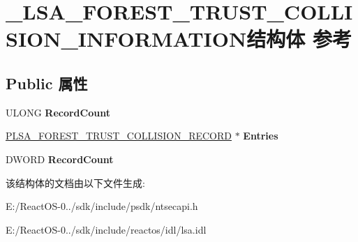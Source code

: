 \hypertarget{struct___l_s_a___f_o_r_e_s_t___t_r_u_s_t___c_o_l_l_i_s_i_o_n___i_n_f_o_r_m_a_t_i_o_n}{}\section{\+\_\+\+L\+S\+A\+\_\+\+F\+O\+R\+E\+S\+T\+\_\+\+T\+R\+U\+S\+T\+\_\+\+C\+O\+L\+L\+I\+S\+I\+O\+N\+\_\+\+I\+N\+F\+O\+R\+M\+A\+T\+I\+O\+N结构体 参考}
\label{struct___l_s_a___f_o_r_e_s_t___t_r_u_s_t___c_o_l_l_i_s_i_o_n___i_n_f_o_r_m_a_t_i_o_n}
\subsection*{Public 属性}
\begin{DoxyCompactItemize}
\item 
\mbox{\label{struct___l_s_a___f_o_r_e_s_t___t_r_u_s_t___c_o_l_l_i_s_i_o_n___i_n_f_o_r_m_a_t_i_o_n_a5e6325b8a5baf039b2392357a38282ca}} 
U\+L\+O\+NG {\bfseries Record\+Count}
\item 
\mbox{\label{struct___l_s_a___f_o_r_e_s_t___t_r_u_s_t___c_o_l_l_i_s_i_o_n___i_n_f_o_r_m_a_t_i_o_n_a4269bdd5a3c9bcb1e8f0c8d5644e4431}} 
\hyperlink{struct___l_s_a___f_o_r_e_s_t___t_r_u_s_t___c_o_l_l_i_s_i_o_n___r_e_c_o_r_d}{P\+L\+S\+A\+\_\+\+F\+O\+R\+E\+S\+T\+\_\+\+T\+R\+U\+S\+T\+\_\+\+C\+O\+L\+L\+I\+S\+I\+O\+N\+\_\+\+R\+E\+C\+O\+RD} $\ast$ {\bfseries Entries}
\item 
\mbox{\label{struct___l_s_a___f_o_r_e_s_t___t_r_u_s_t___c_o_l_l_i_s_i_o_n___i_n_f_o_r_m_a_t_i_o_n_a702b42db85fbff6c466364a86643b887}} 
D\+W\+O\+RD {\bfseries Record\+Count}
\end{DoxyCompactItemize}


该结构体的文档由以下文件生成\+:\begin{DoxyCompactItemize}
\item 
E\+:/\+React\+O\+S-\/0../sdk/include/psdk/ntsecapi.\+h\item 
E\+:/\+React\+O\+S-\/0../sdk/include/reactos/idl/lsa.\+idl\end{DoxyCompactItemize}
